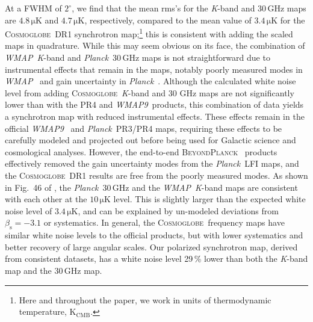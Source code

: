 \documentclass[twocolumn]{../../common/aa}
\def\WMAP{\emph{WMAP}}
\def\WMAPnine{\emph{WMAP9}}
\def\Planck{\emph{Planck}}
\newcommand{\bp}{\textsc{BeyondPlanck}}
\newcommand{\cosmoglobe}{\textsc{Cosmoglobe}}
\newcommand{\K}[0]{\textit K}
\begin{document}
At a FWHM of $2^\circ$, we find that the mean rms's for the \K-band and 30\,GHz maps are $4.8\,\mathrm{\mu K}$ and $4.7\,\mathrm{\mu K}$, respectively, compared to the mean value of $3.4\,\mathrm{\mu K}$ for the \cosmoglobe\ DR1 synchrotron map;\footnote{
	Here and throughout the paper, we work in units of thermodynamic temperature, $\mathrm{K_{CMB}}.$
}
this is consistent with adding the scaled maps in quadrature. 
While this may seem obvious on its face,  the combination of \WMAP\ \K-band and \Planck\ 30\,GHz maps is not straightforward due to instrumental effects that remain in the maps, notably poorly measured modes in \WMAP\ \citep{bennett2012,weiland:2018} and gain uncertainty in \Planck\ \citep{planck2016-l02}. Although the calculated white noise level from adding \cosmoglobe\ \K-band and 30 GHz maps are not significantly lower than with the PR4 and \WMAPnine\ products, this combination of data yields a synchrotron map with reduced instrumental effects. These effects remain in the official \WMAPnine\ \citep{bennett2012} and \Planck\ PR3/PR4 \citep{planck2016-l02,planck2020-LVII} maps, requiring these effects to be carefully modeled and projected out before being used for  Galactic science and cosmological analyses. However, the end-to-end \bp\ \citep{bp01} products effectively removed the gain uncertainty modes from the \Planck\ LFI maps, and the \cosmoglobe\ DR1 results \citep{watts2023_dr1} are free from the poorly measured modes. As shown in Fig.~46 of \citet{watts2023_dr1}, the \Planck\ 30\,GHz and the \WMAP\ \K-band maps are consistent with each other at the $10\,\mathrm{\mu K}$ level. This is slightly larger than the expected white noise level of $3.4\,\mathrm{\mu K}$, and can be explained by un-modeled deviations from $\beta_\mathrm s=-3.1$ or systematics. In general, the \cosmoglobe\ frequency maps have similar white noise levels to the official products, but with lower systematics and better recovery of large angular scales.
Our polarized synchrotron map, derived from consistent datasets, has a white noise level 29\,\% lower than both the \K-band map and the 30\,GHz map.



\end{document}
